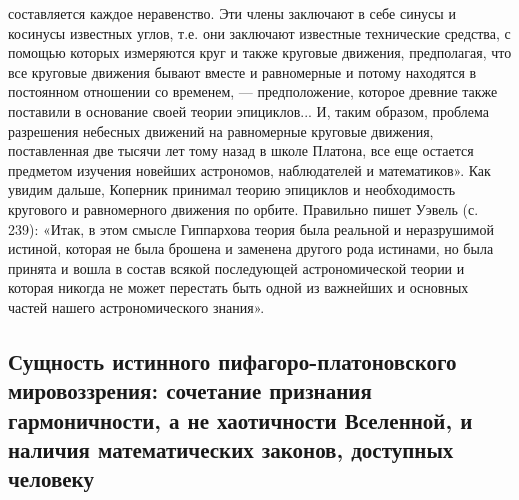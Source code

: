 составляется каждое неравенство.  Эти члены заключают в  себе синусы и
косинусы  известных углов,  т.е. они  заключают известные  технические
средства,  с   помощью  которых  измеряются  круг   и  также  круговые
движения,  предполагая,  что все  круговые  движения  бывают вместе  и
равномерные и потому находятся в постоянном отношении со временем, ---
предположение,  которое  древние  также поставили  в  основание  своей
теории  эпициклов... И,  таким образом,  проблема разрешения  небесных
движений на равномерные круговые движения, поставленная две тысячи лет
тому  назад  в школе  Платона,  все  еще остается  предметом  изучения
новейших астрономов,  наблюдателей и математиков». Как  увидим дальше,
Коперник  принимал  теорию  эпициклов   и  необходимость  кругового  и
равномерного  движения по  орбите.  Правильно пишет  Уэвель (с.  239):
«Итак, в  этом смысле Гиппархова  теория была реальной  и неразрушимой
истиной, которая не была брошена  и заменена другого рода истинами, но
была  принята  и вошла  в  состав  всякой последующей  астрономической
теории и которая никогда не может  перестать быть одной из важнейших и
основных частей нашего астрономического знания».

\subsection{Сущность  истинного пифагоро-платоновского  мировоззрения:
сочетание  признания  гармоничности,  а не  хаотичности  Вселенной,  и
наличия математических законов, доступных человеку}

